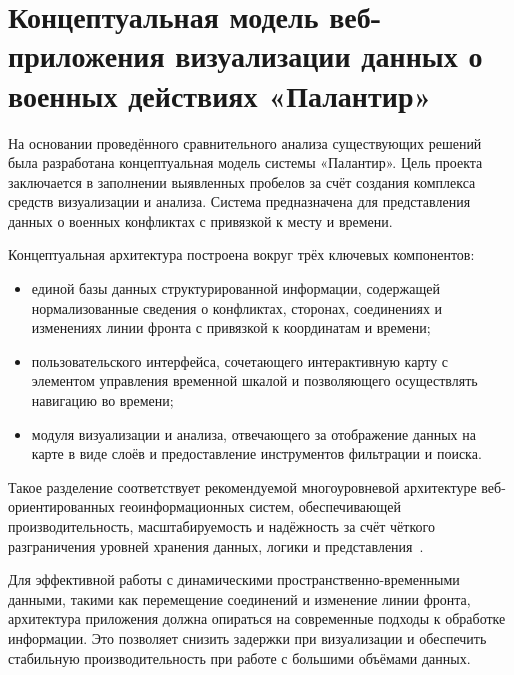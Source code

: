 \section{Концептуальная модель веб-приложения визуализации данных о военных действиях «Палантир»}

На основании проведённого сравнительного анализа существующих решений была разработана концептуальная модель системы «Палантир». Цель проекта заключается в заполнении выявленных пробелов за счёт создания комплекса средств визуализации и анализа. Система предназначена для представления данных о военных конфликтах с привязкой к месту и времени.

Концептуальная архитектура построена вокруг трёх ключевых компонентов:
\begin{itemize}
\item единой базы данных структурированной информации, содержащей нормализованные сведения о конфликтах, сторонах, соединениях и изменениях линии фронта с привязкой к координатам и времени;
\item пользовательского интерфейса, сочетающего интерактивную карту с элементом управления временной шкалой и позволяющего осуществлять навигацию во времени;
\item модуля визуализации и анализа, отвечающего за отображение данных на карте в виде слоёв и предоставление инструментов фильтрации и поиска.
\end{itemize}

Такое разделение соответствует рекомендуемой многоуровневой архитектуре веб-ориентированных геоинформационных систем, обеспечивающей производительность, масштабируемость и надёжность за счёт чёткого разграничения уровней хранения данных, логики и представления~\cite{sommerville2015software}.

Для эффективной работы с динамическими пространственно-временными данными, такими как перемещение соединений и изменение линии фронта, архитектура приложения должна опираться на современные подходы к обработке информации. Это позволяет снизить задержки при визуализации и обеспечить стабильную производительность при работе с большими объёмами данных.

